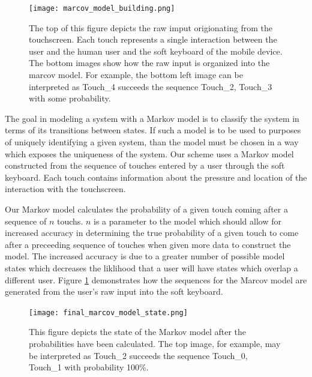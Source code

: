 \documentclass{acm_proc_article-sp}
\begin{document}
\begin{figure}
\centering
\texttt{[image: marcov\_model\_building.png]}
\caption{The top of this figure depicts the raw imput origionating from the touchscreen. Each touch represents a single interaction between the user and the human user and the soft keyboard of the mobile device. The bottom images show how the raw input is organized into the marcov model. For example, the bottom left image can be interpreted as Touch\_4 succeeds the sequence Touch\_2, Touch\_3 with some probability.}
\label{fig:markov_model_building}
\end{figure}


The goal in modeling a system with a Markov model is to classify the system in terms of its transitions between states. If such a model is to be used to purposes of uniquely identifying a given system, than the model must be chosen in a way which exposes the uniqueness of the system. Our scheme uses a Markov model constructed from the sequence of touches entered by a user through the soft keyboard.
Each touch contains information about the pressure and location of the interaction with the touchscreen.

Our Markov model calculates the probability of a given touch coming after a sequence of $n$ touchs.
$n$ is a parameter to the model which should allow for increased accuracy in determining the true probability of a given touch to come after a preceeding sequence of touches when given more data to construct the model. The increased accuracy is due to a greater number of possible model states which decreases the liklihood that a user will have states which overlap a different user.
Figure \ref{fig:markov_model_building} demonstrates how the sequences for the Marcov model are generated from the user's raw input into the soft keyboard.

\begin{figure}
\centering
\texttt{[image: final\_marcov\_model\_state.png]}
\caption{This figure depicts the state of the Markov model after the probabilities have been calculated. The top image, for example, may be interpreted as Touch\_2 succeeds the sequence Touch\_0, Touch\_1 with probability 100\%.}
\label{fig:final_markov_model_state}
\end{figure}
\end{document}
